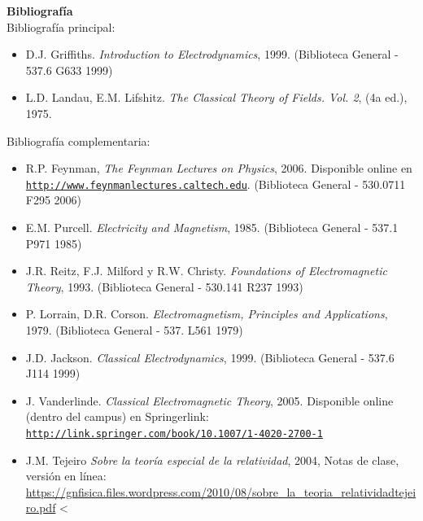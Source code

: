 \documentclass[letterpaper,10pt,onecolumn]{article}
\begin{document}
\noindent\textbf{\large {} \quad
  Bibliograf\'ia}\\[-0.2cm] 


\noindent\normalsize Bibliograf\'ia principal:

\begin{itemize}
	\item D.J. Griffiths. \textit{Introduction to
          Electrodynamics}, 1999. (Biblioteca General - 537.6 G633
          1999) 
        \item L.D. Landau, E.M. Lifshitz. \textit{The Classical
          Theory of Fields. Vol. 2}, (4a ed.), 1975.
\end{itemize}

\noindent\normalsize Bibliograf\'ia complementaria:

\begin{itemize}
	\item R.P. Feynman, \textit{The Feynman Lectures on Physics},
          2006. Disponible online en
          \href{http://www.feynmanlectures.caltech.edu}{\nolinkurl{http://www.feynmanlectures.caltech.edu}}. (Biblioteca
          General - 530.0711 F295 2006)\\[-0.6cm] 
	\item E.M. Purcell. \textit{Electricity and Magnetism},
          1985. (Biblioteca General - 537.1 P971 1985)\\[-0.6cm] 
	\item J.R. Reitz, F.J. Milford y
          R.W. Christy. \textit{Foundations of Electromagnetic
            Theory}, 1993. (Biblioteca General - 530.141 R237
          1993)\\[-0.6cm] 
	\item P. Lorrain, D.R. Corson. \textit{Electromagnetism,
          Principles and Applications}, 1979. (Biblioteca General -
          537. L561 1979)\\[-0.6cm] 
	\item J.D. Jackson. \textit{Classical Electrodynamics},
          1999. (Biblioteca General - 537.6 J114 1999)\\[-0.6cm] 
	\item J. Vanderlinde. \textit{Classical Electromagnetic Theory}, 2005. Disponible online (dentro del campus) en Springerlink:\\
	\href{http://link.springer.com/book/10.1007/1-4020-2700-1}{\nolinkurl{http://link.springer.com/book/10.1007/1-4020-2700-1}} 
        \item J.M. Tejeiro \textit{Sobre la teor\'ia especial de la
          relatividad}, 2004, Notas de clase, versi\'on en l\'inea:
          \url{https://gnfisica.files.wordpress.com/2010/08/sobre_la_teoria_relatividadtejeiro.pdf} <
\end{itemize}
\end{document}
